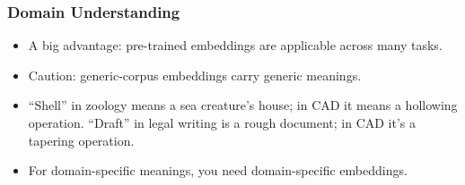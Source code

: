 
\begin{frame}[fragile]\frametitle{Domain Understanding}
	\begin{itemize}
	\item A big advantage: pre-trained embeddings are applicable across many tasks.
	\item Caution: generic-corpus embeddings carry generic meanings.
	\item ``Shell'' in zoology means a sea creature's house; in CAD it means a hollowing operation. ``Draft'' in legal writing is a rough document; in CAD it's a tapering operation.
	\item For domain-specific meanings, you need domain-specific embeddings.
	\end{itemize}
\end{frame}


